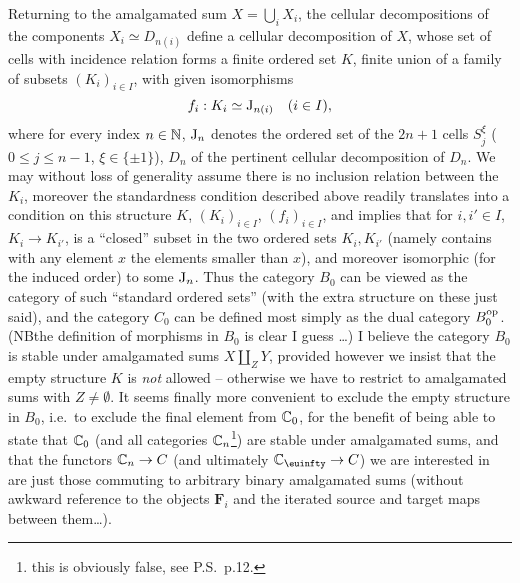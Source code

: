 \bigbreak

\noindent\hfill{}\par

%
\label{sec:8}%
Returning to the amalgamated sum $X = \bigcup_i X_i$, the cellular
decompositions of the components $X_i \simeq D_{n(i)}$ define a
cellular decomposition of $X$, whose set of cells with incidence
relation forms a finite ordered set $K$, finite union of a family of
subsets $(K_i)_{i\in I}$, with given isomorphisms
\[ f_i : K_i \simeq \mathrm{J}_{n(i)} \quad (i\in I),\]
where for every index $n\in{\ensuremath{\mathbb{N}}}$, $\mathrm{J}_n$ denotes the ordered set of
the $2n+1$ cells $S_j^\xi$ ($0\le j\le n-1$, $\xi\in\{\pm1\}$), $D_n$
of the pertinent cellular decomposition of $D_n$. We may without loss
of generality assume there is no inclusion relation between the $K_i$,
moreover the standardness condition described above readily translates
into a condition on this structure $K$, $(K_i)_{i\in I}$, $(f_i)_{i\in
  I}$, and implies that for $i,i'\in I$, $K_i\to K_{i'}$, is a
``closed'' subset in the two ordered sets $K_i,K_{i'}$ (namely
contains with any element $x$ the elements smaller than $x$), and
moreover isomorphic (for the induced order) to some $\mathrm{J}_n$. Thus
the category $B_0$ can be viewed as the category of such ``standard
ordered sets'' (with the extra structure on these just said), and the
category $C_0$ can be defined most simply as the dual category
$B_0^{\mathrm{op}}$. (NB\enspace the definition of morphisms in $B_0$ is clear I guess
\ldots) I believe the category $B_0$ is stable under amalgamated sums
$X \amalg_Z Y$, provided however we insist that the empty structure
$K$ is \emph{not} allowed -- otherwise we have to restrict to
amalgamated sums with $Z \ne \emptyset$. It seems finally more
convenient to exclude the empty structure in $B_0$, i.e.\ to exclude
the final element from ${\mathbb{C}}_0$, for the benefit of being able to
state that ${\mathbb{C}}_0$ (and all categories ${\mathbb{C}}_n$\footnote{this is
  obviously false, see P.S.\ p.12.}) are stable under amalgamated sums,
and that the functors ${\mathbb{C}}_n\to C$ (and ultimately $\bC_\oo\to
C$) we are interested in are just those commuting to arbitrary binary
amalgamated sums (without awkward reference to the objects $\boldsymbol F_i$
and the iterated source and target maps between them\ldots).

